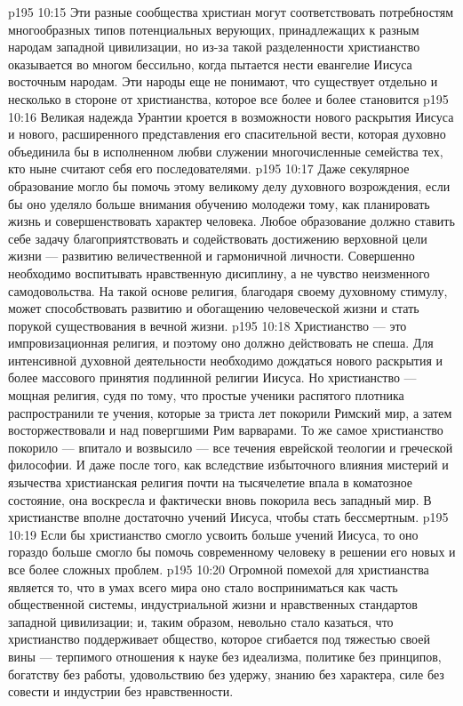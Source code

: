 \vs p195 10:15 Эти разные сообщества христиан могут соответствовать потребностям многообразных типов потенциальных верующих, принадлежащих к разным народам западной цивилизации, но из\hyp{}за такой разделенности христианство оказывается во многом бессильно, когда пытается нести евангелие Иисуса восточным народам. Эти народы еще не понимают, что существует  отдельно и несколько в стороне от христианства, которое все более и более становится 
\vs p195 10:16 Великая надежда Урантии кроется в возможности нового раскрытия Иисуса и нового, расширенного представления его спасительной вести, которая духовно объединила бы в исполненном любви служении многочисленные семейства тех, кто ныне считают себя его последователями.
\vs p195 10:17 Даже секулярное образование могло бы помочь этому великому делу духовного возрождения, если бы оно уделяло больше внимания обучению молодежи тому, как планировать жизнь и совершенствовать характер человека. Любое образование должно ставить себе задачу благоприятствовать и содействовать достижению верховной цели жизни --- развитию величественной и гармоничной личности. Совершенно необходимо воспитывать нравственную дисиплину, а не чувство неизменного самодовольства. На такой основе религия, благодаря своему духовному стимулу, может способствовать развитию и обогащению человеческой жизни и стать порукой существования в вечной жизни.
\vs p195 10:18 Христианство --- это импровизационная религия, и поэтому оно должно действовать не спеша. Для интенсивной духовной деятельности необходимо дождаться нового раскрытия и более массового принятия подлинной религии Иисуса. Но христианство --- мощная религия, судя по тому, что простые ученики распятого плотника распространили те учения, которые за триста лет покорили Римский мир, а затем восторжествовали и над повергшими Рим варварами. То же самое христианство покорило --- впитало и возвысило --- все течения еврейской теологии и греческой философии. И даже после того, как вследствие избыточного влияния мистерий и язычества христианская религия почти на тысячелетие впала в коматозное состояние, она воскресла и фактически вновь покорила весь западный мир. В христианстве вполне достаточно учений Иисуса, чтобы стать бессмертным.
\vs p195 10:19 Если бы христианство смогло усвоить больше учений Иисуса, то оно гораздо больше смогло бы помочь современному человеку в решении его новых и все более сложных проблем.
\vs p195 10:20 Огромной помехой для христианства является то, что в умах всего мира оно стало восприниматься как часть общественной системы, индустриальной жизни и нравственных стандартов западной цивилизации; и, таким образом, невольно стало казаться, что христианство поддерживает общество, которое сгибается под тяжестью своей вины --- терпимого отношения к науке без идеализма, политике без принципов, богатству без работы, удовольствию без удержу, знанию без характера, силе без совести и индустрии без нравственности.
